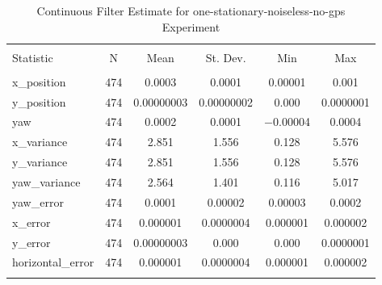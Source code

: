 
\begin{table}[h] \centering 
  \caption{Continuous Filter Estimate for one-stationary-noiseless-no-gps Experiment} 
  \label{tab:one_stationary_noiseless_no_gps_continuous_summary} 
\begin{tabular}{@{\extracolsep{5pt}}lccccc} 
\\[-1.8ex]\hline 
\hline \\[-1.8ex] 
Statistic & \multicolumn{1}{c}{N} & \multicolumn{1}{c}{Mean} & \multicolumn{1}{c}{St. Dev.} & \multicolumn{1}{c}{Min} & \multicolumn{1}{c}{Max} \\ 
\hline \\[-1.8ex] 
x\_position & 474 & \num{0.0003} & \num{0.0001} & \num{0.00001} & \num{0.001} \\ 
y\_position & 474 & \num{0.00000003} & \num{0.00000002} & \num{0.000} & \num{0.0000001} \\ 
yaw & 474 & \num{0.0002} & \num{0.0001} & $-$0.00004 & \num{0.0004} \\ 
x\_variance & 474 & \num{2.851} & \num{1.556} & \num{0.128} & \num{5.576} \\ 
y\_variance & 474 & \num{2.851} & \num{1.556} & \num{0.128} & \num{5.576} \\ 
yaw\_variance & 474 & \num{2.564} & \num{1.401} & \num{0.116} & \num{5.017} \\ 
yaw\_error & 474 & \num{0.0001} & \num{0.00002} & \num{0.00003} & \num{0.0002} \\ 
x\_error & 474 & \num{0.000001} & \num{0.0000004} & \num{0.000001} & \num{0.000002} \\ 
y\_error & 474 & \num{0.00000003} & \num{0.000} & \num{0.000} & \num{0.0000001} \\ 
horizontal\_error & 474 & \num{0.000001} & \num{0.0000004} & \num{0.000001} & \num{0.000002} \\ 
\hline \\[-1.8ex] 
\end{tabular} 
\end{table} 
